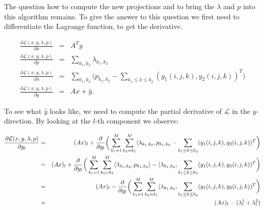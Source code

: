             The question how to compute the new projections and to bring the $\lambda$ and $p$ into this algorithm remains. To give the answer to this question we first need to differentiate the Lagrange function, to get the derivative.

                \begin{eqnarray}
                    \frac{\partial \mathcal{L}(x, y, \lambda, p)}{\partial x} &=& A^{T} y \\
                    \frac{\partial \mathcal{L}(x, y, \lambda, p)}{\partial p} &=& \sum_{k_{1}, k_{2}} \lambda_{k_{1}, k_{2}} \\
                    \frac{\partial \mathcal{L}(x, y, \lambda, p)}{\partial \lambda} &=& \sum_{k_{1}, k_{2}} \bigg( p_{k_{1}, k_{2}} - \sum_{k_{1} \le k \le k_{2}} (y_{1}(i, j, k), y_{2}(i, j, k))^{T} \bigg) \\
                    \frac{\partial \mathcal{L}(x, y, \lambda, p)}{\partial y} &=& Ax + \hat{y}.
                \end{eqnarray}

            To see what $\hat{y}$ looks like, we need to compute the partial derivative of $\mathcal{L}$ in the $y$-direction. By looking at the $l$-th component we observe:

                \begin{eqnarray}
                    \frac{\partial \mathcal{L}(x, y, \lambda, p)}{\partial y_{l}} &=& (Ax)_{l} + \frac{\partial}{\partial y_{l}} \bigg(\sum_{k_{1} = 1}^{M} \sum_{k_{2} = k_{1}}^{M} \langle \lambda_{k_{1}, k_{2}}, p_{k_{1}, k_{2}} - \sum_{k_{1} \le k \le k_{2}} (y_{1}(i, j, k), y_{2}(i, j, k))^{T} \bigg) \notag \\
                    &=& (Ax)_{l} + \frac{\partial}{\partial y_{l}} \bigg(\sum_{k_{1} = 1}^{M} \sum_{k_{2} = k_{1}}^{M} \langle \lambda_{k_{1}, k_{2}}, p_{k_{1}, k_{2}} \rangle - \langle \lambda_{k_{1}, k_{2}}, \sum_{k_{1} \le k \le k_{2}} (y_{1}(i, j, k), y_{2}(i, j, k))^{T} \bigg) \notag \\
                    &=& (Ax)_{l} - \frac{\partial}{\partial y_{l}} \bigg(\sum_{k_{1} = 1}^{M} \sum_{k_{2} = k_{1}}^{M} \langle \lambda_{k_{1}, k_{2}}, \sum_{k_{1} \le k \le k_{2}} (y_{1}(i, j, k), y_{2}(i, j, k))^{T} \bigg) \notag \\
                    &=& (Ax)_{l} - (\lambda_{l}^{1} + \lambda_{l}^{2})
                \end{eqnarray}

